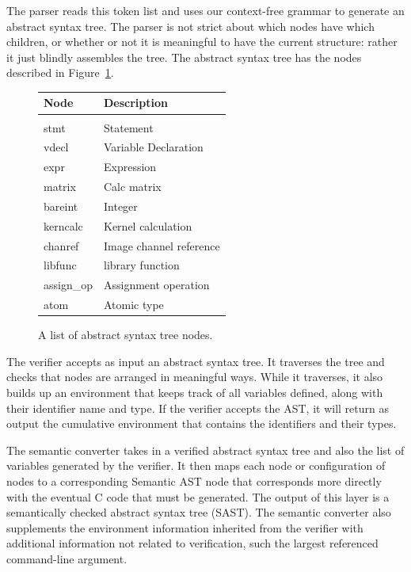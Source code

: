 The parser reads this token list and uses our context-free grammar to generate
an abstract syntax tree. The parser is not strict about which nodes have
which children, or whether or not it is meaningful to have the current
structure: rather it just blindly assembles the tree. The abstract syntax tree
has the nodes described in Figure~\ref{fig:astnodes}.

\begin{figure}
\begin{center}
\begin{tabular}{l | l}
{\bf Node} & {\bf Description} \\
\hline \\
stmt & Statement \\
vdecl & Variable Declaration \\
expr & Expression \\
matrix & Calc matrix \\
bareint & Integer \\
kerncalc & Kernel calculation \\
chanref & Image channel reference \\
libfunc & \sys{} library function \\
assign\_op & Assignment operation \\
atom & Atomic type
\end{tabular}
\caption{A list of abstract syntax tree nodes.}
\label{fig:astnodes}
\end{center}
\end{figure}

The verifier accepts as input an abstract syntax tree. It traverses the
tree and checks that nodes are arranged in meaningful ways. While it
traverses, it also builds up an environment that keeps track of all
variables defined, along with their identifier name and type. If the
verifier accepts the AST, it will return as output the cumulative
environment that contains the identifiers and their types.

The semantic converter takes in a verified abstract syntax tree and also the
list of variables generated by the verifier. It then maps each node or
configuration of nodes to a corresponding Semantic AST node that
corresponds more directly with the eventual C code that must be generated.
The output of this layer is a semantically checked abstract syntax tree
(SAST). The semantic converter also supplements the environment information
inherited from the verifier with additional information not related to
verification, such the largest referenced command-line argument.

